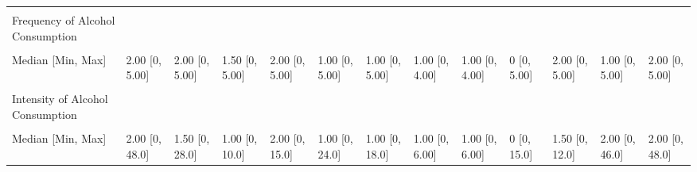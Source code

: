 \documentclass[
  single column]{article}
\begin{document}
\begin{landscape}
\begin{longtable}[t]{lllllllllllll}
\cellcolor{gray!10}{Missing} & \cellcolor{gray!10}{51 (0.2\%)} & \cellcolor{gray!10}{3 (0.2\%)} & \cellcolor{gray!10}{0 (0\%)} & \cellcolor{gray!10}{5 (0.2\%)} & \cellcolor{gray!10}{12 (0.3\%)} & \cellcolor{gray!10}{4 (0.4\%)} & \cellcolor{gray!10}{0 (0\%)} & \cellcolor{gray!10}{0 (0\%)} & \cellcolor{gray!10}{3 (0.5\%)} & \cellcolor{gray!10}{1 (0.2\%)} & \cellcolor{gray!10}{4 (0.5\%)} & \cellcolor{gray!10}{83 (0.3\%)}\\
Frequency of Alcohol Consumption &  &  &  &  &  &  &  &  &  &  &  & \\
\addlinespace
\cellcolor{gray!10}{Mean (SD)} & \cellcolor{gray!10}{2.05 (1.33)} & \cellcolor{gray!10}{2.20 (1.38)} & \cellcolor{gray!10}{1.66 (1.35)} & \cellcolor{gray!10}{1.99 (1.34)} & \cellcolor{gray!10}{1.62 (1.34)} & \cellcolor{gray!10}{1.37 (1.34)} & \cellcolor{gray!10}{1.32 (1.28)} & \cellcolor{gray!10}{1.55 (1.18)} & \cellcolor{gray!10}{0.112 (0.557)} & \cellcolor{gray!10}{2.02 (1.37)} & \cellcolor{gray!10}{1.51 (1.38)} & \cellcolor{gray!10}{1.92 (1.36)}\\
Median [Min, Max] & 2.00 [0, 5.00] & 2.00 [0, 5.00] & 1.50 [0, 5.00] & 2.00 [0, 5.00] & 1.00 [0, 5.00] & 1.00 [0, 5.00] & 1.00 [0, 4.00] & 1.00 [0, 4.00] & 0 [0, 5.00] & 2.00 [0, 5.00] & 1.00 [0, 5.00] & 2.00 [0, 5.00]\\
\cellcolor{gray!10}{Missing} & \cellcolor{gray!10}{449 (2.1\%)} & \cellcolor{gray!10}{40 (2.9\%)} & \cellcolor{gray!10}{8 (3.0\%)} & \cellcolor{gray!10}{78 (3.9\%)} & \cellcolor{gray!10}{92 (2.5\%)} & \cellcolor{gray!10}{30 (2.7\%)} & \cellcolor{gray!10}{4 (2.9\%)} & \cellcolor{gray!10}{5 (5.7\%)} & \cellcolor{gray!10}{22 (3.3\%)} & \cellcolor{gray!10}{19 (3.3\%)} & \cellcolor{gray!10}{23 (3.1\%)} & \cellcolor{gray!10}{770 (2.4\%)}\\
Intensity of Alcohol Consumption &  &  &  &  &  &  &  &  &  &  &  & \\
\cellcolor{gray!10}{Mean (SD)} & \cellcolor{gray!10}{2.36 (2.25)} & \cellcolor{gray!10}{1.83 (1.84)} & \cellcolor{gray!10}{1.66 (1.40)} & \cellcolor{gray!10}{2.08 (1.89)} & \cellcolor{gray!10}{1.65 (1.80)} & \cellcolor{gray!10}{1.58 (2.07)} & \cellcolor{gray!10}{1.60 (1.57)} & \cellcolor{gray!10}{1.50 (1.30)} & \cellcolor{gray!10}{0.387 (1.52)} & \cellcolor{gray!10}{1.80 (1.55)} & \cellcolor{gray!10}{2.24 (3.30)} & \cellcolor{gray!10}{2.17 (2.18)}\\
\addlinespace
Median [Min, Max] & 2.00 [0, 48.0] & 1.50 [0, 28.0] & 1.00 [0, 10.0] & 2.00 [0, 15.0] & 1.00 [0, 24.0] & 1.00 [0, 18.0] & 1.00 [0, 6.00] & 1.00 [0, 6.00] & 0 [0, 15.0] & 1.50 [0, 12.0] & 2.00 [0, 46.0] & 2.00 [0, 48.0]\\

\end{longtable}
\end{landscape}
\end{document}
